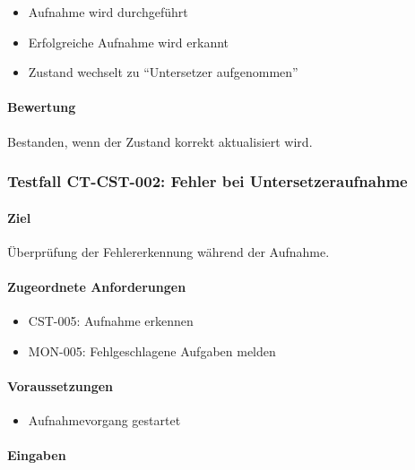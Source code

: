 \begin{itemize}
\tightlist
\item
  Aufnahme wird durchgeführt
\item
  Erfolgreiche Aufnahme wird erkannt
\item
  Zustand wechselt zu ``Untersetzer aufgenommen''
\end{itemize}

\paragraph{Bewertung}\label{bewertung-5}

Bestanden, wenn der Zustand korrekt aktualisiert wird.

\subsubsection{Testfall CT-CST-002: Fehler bei
Untersetzeraufnahme}\label{testfall-ct-cst-002-fehler-bei-untersetzeraufnahme}

\paragraph{Ziel}\label{ziel-6}

Überprüfung der Fehlererkennung während der Aufnahme.

\paragraph{Zugeordnete Anforderungen}\label{zugeordnete-anforderungen-6}

\begin{itemize}
\tightlist
\item
  CST-005: Aufnahme erkennen
\item
  MON-005: Fehlgeschlagene Aufgaben melden
\end{itemize}

\paragraph{Voraussetzungen}\label{voraussetzungen-6}

\begin{itemize}
\tightlist
\item
  Aufnahmevorgang gestartet
\end{itemize}

\paragraph{Eingaben}\label{eingaben-6}

